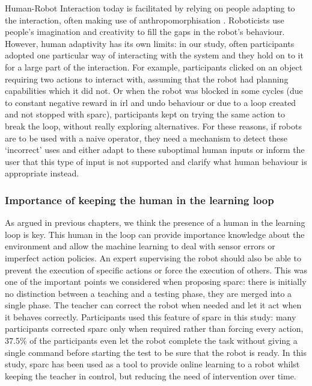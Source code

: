 Human-Robot Interaction today is facilitated by relying on people adapting to the interaction, often making use of anthropomorphisation \citep{zlotowski2015anthropomorphism}. Roboticists use people's imagination and creativity to fill the gaps in the robot's behaviour. However, human adaptivity has its own limits: in our study, often participants adopted one particular way of interacting with the system and they hold on to it for a large part of the interaction. For example, participants clicked on an object requiring two actions to interact with, assuming that the robot had planning capabilities which it did not. Or when the robot was blocked in some cycles (due to constant negative reward in \gls{irl} and undo behaviour or due to a loop created and not stopped with \gls{sparc}), participants kept on trying the same action to break the loop, without really exploring alternatives. For these reasons, if robots are to be used with a naive operator, they need a mechanism to detect these `incorrect' uses and either adapt to these suboptimal human inputs or inform the user that this type of input is not supported and clarify what human behaviour is appropriate instead.

\subsubsection{Importance of keeping the human in the learning loop}

As argued in previous chapters, we think the presence of a human in the learning loop is key. This human in the loop can provide importance knowledge about the environment and allow the machine learning to deal with sensor errors or imperfect action policies. An expert supervising the robot should also be able to prevent the execution of specific actions or force the execution of others. This was one of the important points we considered when proposing \gls{sparc}: there is initially no distinction between a teaching and a testing phase, they are merged into a single phase. The teacher can correct the robot when needed and let it act when it behaves correctly. Participants used this feature of \gls{sparc} in this study: many participants corrected \gls{sparc} only when required rather than forcing every action, 37.5\% of the participants even let the robot complete the task without giving a single command before starting the test to be sure that the robot is ready. In this study, \gls{sparc} has been used as a tool to provide online learning to a robot whilst keeping the teacher in control, but reducing the need of intervention over time.

